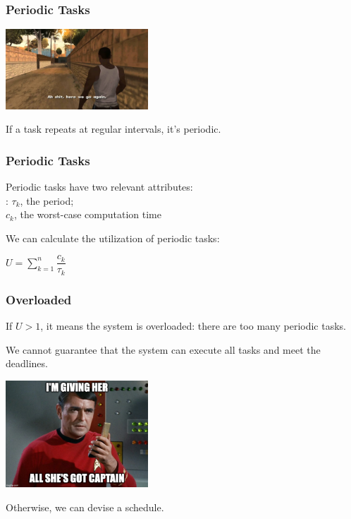 \begin{frame}
\frametitle{Periodic Tasks}

\begin{center}
	\includegraphics[width=0.4\textwidth]{images/periodic.jpg}
\end{center}

If a task repeats at regular intervals, it's \alert{periodic}.

\end{frame}

\begin{frame}
\frametitle{Periodic Tasks}

Periodic tasks have two relevant attributes:\\
\quad: $\tau_{k}$, the period; \\
\quad $c_{k}$, the worst-case computation time

We can calculate the utilization of periodic tasks:

\begin{center}
$U = \sum\limits_{k=1}^n\dfrac{c_{k}}{\tau_{k}}$
\end{center}

\end{frame}

\begin{frame}
\frametitle{Overloaded}

If $U > 1$, it means the system is overloaded: there are too many periodic tasks. 

We cannot guarantee that the system can execute all tasks and meet the deadlines.

\begin{center}
	\includegraphics[width=0.4\textwidth]{images/allshesgot.jpg}
\end{center}

Otherwise, we can devise a schedule.

\end{frame}

